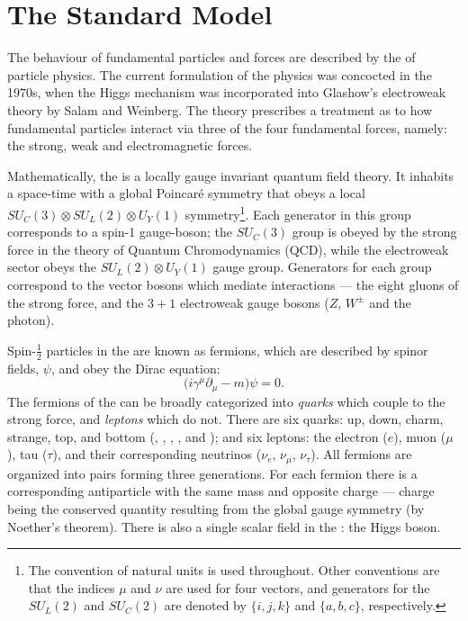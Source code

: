 \section{The Standard Model}
\label{sec:sm}
The behaviour of fundamental particles and forces are described by the \sm of
particle physics.
The current formulation of the \sm physics was concocted in the 1970s, when the Higgs
mechanism was incorporated into Glashow's electroweak theory by Salam and Weinberg.
The theory prescribes a treatment
as to how fundamental particles interact via three of the four
fundamental forces, namely: the strong, weak and electromagnetic forces.

Mathematically, the \sm is a locally gauge invariant quantum field theory.
It inhabits a space-time with a global Poincar\'e symmetry that obeys a local
$SU_C(3)\otimes SU_L(2)\otimes U_Y(1)$ symmetry\footnote{
The convention of natural units is used throughout.
Other conventions are that the indices $\mu$ and $\nu$ are used for four vectors, and generators
for the $SU_L(2)$ and $SU_C(2)$ are denoted by $\{i,j,k\}$ and $\{a,b,c\}$, respectively.}.
Each generator in this group corresponds to a spin-1 gauge-boson;
the $SU_C(3)$ group is obeyed by the strong force in the theory of Quantum Chromodynamics (QCD),
while the electroweak sector obeys the $SU_L(2)\otimes U_Y(1)$ gauge group.
Generators for each group correspond to the vector bosons which mediate
interactions --- the eight gluons of the strong force, and the $3+1$ electroweak gauge bosons ($Z$,
$W^\pm$ and the photon).

Spin-$\tfrac12$ particles in the \sm are known as fermions,
which are described by spinor fields, $\psi$, and obey the Dirac equation:
\begin{equation}
  \big(i\gamma^\mu\partial_\mu - m\big)\psi = 0.
  \label{th:eq:dirac}
\end{equation}
The fermions of the \sm can be broadly categorized into \emph{quarks} which couple to the strong
force, and \emph{leptons} which do not.
There are six quarks: up, down, charm, strange, top, and bottom (\uquark, \dquark, \cquark,
\squark, \tquark and \bquark); and six leptons: the electron ($e$), muon ($\mu$), tau ($\tau$), and
their corresponding neutrinos ($\nu_e$, $\nu_\mu$, $\nu_\tau$).
All fermions are organized into pairs forming three generations.
For each fermion there is a corresponding antiparticle with the same mass and opposite charge ---
charge being the conserved quantity resulting from the global gauge symmetry (by Noether's
theorem).
There is also a single scalar field in the \sm: the Higgs boson.

